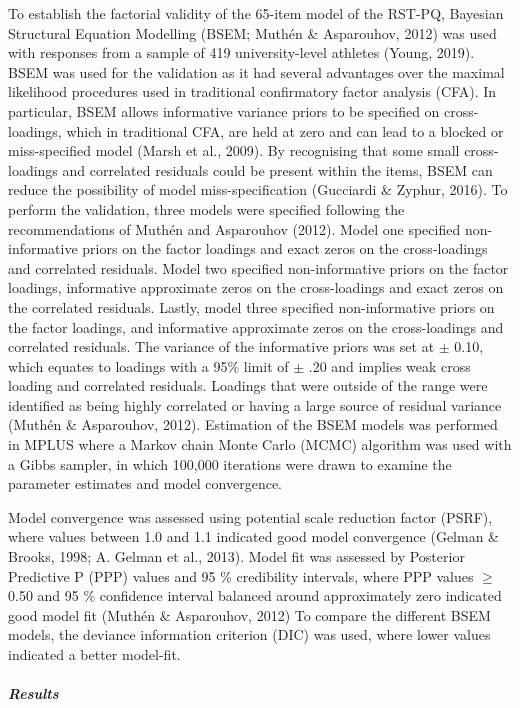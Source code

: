 \documentclass[man,floatsintext]{apa6}
\let\oldsubparagraph\subparagraph
\renewcommand{\subparagraph}[1]{\oldsubparagraph{#1}\mbox{}}
\begin{document}
To establish the factorial validity of the 65-item model of the RST-PQ, Bayesian Structural Equation Modelling (BSEM; Muthén \& Asparouhov, 2012) was used with responses from a sample of 419 university-level athletes (Young, 2019).
BSEM was used for the validation as it had several advantages over the maximal likelihood procedures used in traditional confirmatory factor analysis (CFA).
In particular, BSEM allows informative variance priors to be specified on cross-loadings, which in traditional CFA, are held at zero and can lead to a blocked or miss-specified model (Marsh et al., 2009).
By recognising that some small cross-loadings and correlated residuals could be present within the items, BSEM can reduce the possibility of model miss-specification (Gucciardi \& Zyphur, 2016).
To perform the validation, three models were specified following the recommendations of Muthén and Asparouhov (2012).
Model one specified non-informative priors on the factor loadings and exact zeros on the cross-loadings and correlated residuals.
Model two specified non-informative priors on the factor loadings, informative approximate zeros on the cross-loadings and exact zeros on the correlated residuals.
Lastly, model three specified non-informative priors on the factor loadings, and informative approximate zeros on the cross-loadings and correlated residuals.
The variance of the informative priors was set at \(\pm\) 0.10, which equates to loadings with a 95\% limit of \(\pm\) .20 and implies weak cross loading and correlated residuals.
Loadings that were outside of the range were identified as being highly correlated or having a large source of residual variance (Muthén \& Asparouhov, 2012).
Estimation of the BSEM models was performed in MPLUS where a Markov chain Monte Carlo (MCMC) algorithm was used with a Gibbs sampler, in which 100,000 iterations were drawn to examine the parameter estimates and model convergence.

Model convergence was assessed using potential scale reduction factor (PSRF), where values between 1.0 and 1.1 indicated good model convergence (Gelman \& Brooks, 1998; A. Gelman et al., 2013).
Model fit was assessed by Posterior Predictive P (PPP) values and 95 \% credibility intervals, where PPP values \(\geqslant\) 0.50 and 95 \% confidence interval balanced around approximately zero indicated good model fit (Muthén \& Asparouhov, 2012)
To compare the different BSEM models, the deviance information criterion (DIC) was used, where lower values indicated a better model-fit.

\hypertarget{results}{%
\subparagraph{Results}\label{results}}
\end{document}
